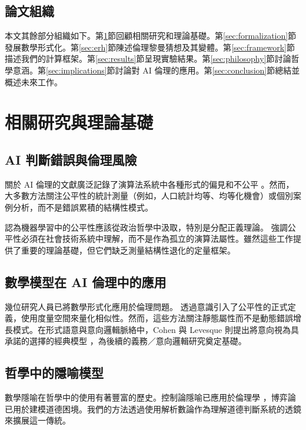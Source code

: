 \documentclass[12pt,a4paper]{article}
\theoremstyle{definition}
\theoremstyle{remark}
\begin{document}
\subsection{論文組織}

本文其餘部分組織如下。第\ref{sec:related}節回顧相關研究和理論基礎。第\ref{sec:formalization}節發展數學形式化。第\ref{sec:erh}節陳述倫理黎曼猜想及其變體。第\ref{sec:framework}節描述我們的計算框架。第\ref{sec:results}節呈現實驗結果。第\ref{sec:philosophy}節討論哲學意涵。第\ref{sec:implications}節討論對 AI 倫理的應用。第\ref{sec:conclusion}節總結並概述未來工作。

\section{相關研究與理論基礎}
\label{sec:related}

\subsection{AI 判斷錯誤與倫理風險}

關於 AI 倫理的文獻廣泛記錄了演算法系統中各種形式的偏見和不公平 \citep{mehrabi2021,barocas2016,oneil2016}。然而，大多數方法關注公平性的統計測量（例如，人口統計均等、均等化機會）或個別案例分析，而不是錯誤累積的結構性模式。

\citet{binns2018} 認為機器學習中的公平性應該從政治哲學中汲取，特別是分配正義理論。\citet{selbst2019} 強調公平性必須在社會技術系統中理解，而不是作為孤立的演算法屬性。雖然這些工作提供了重要的理論基礎，但它們缺乏測量結構性退化的定量框架。

\subsection{數學模型在 AI 倫理中的應用}

幾位研究人員已將數學形式化應用於倫理問題。\citet{dwork2012} 透過意識引入了公平性的正式定義，使用度量空間來量化相似性。然而，這些方法關注靜態屬性而不是動態錯誤增長模式。在形式語意與意向邏輯脈絡中，Cohen 與 Levesque 則提出將意向視為具承諾的選擇的經典模型 \citep{cohen1990}，為後續的義務／意向邏輯研究奠定基礎。

\subsection{哲學中的隱喻模型}

數學隱喻在哲學中的使用有著豐富的歷史。控制論隱喻已應用於倫理學 \citep{floridi2018}，博弈論已用於建模道德困境。我們的方法透過使用解析數論作為理解道德判斷系統的透鏡來擴展這一傳統。
\end{document}
